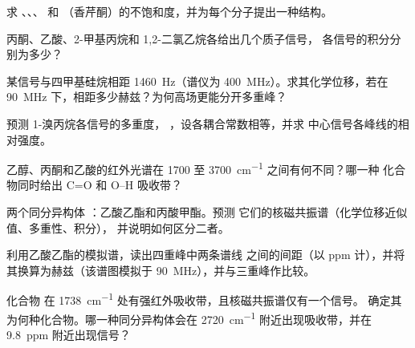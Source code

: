 \begin{exercise}[$\star$]\label{exo:b1:structure-spectroscopy:2}
求 、、、
 和 （香芹酮）的不饱和度，并为每个分子提出一种结构。
\end{exercise}

\begin{exercise}[$\star$]\label{exo:b1:structure-spectroscopy:3}
丙酮、乙酸、2-甲基丙烷和 1,2-二氯乙烷各给出几个质子信号，
各信号的积分分别为多少？
\end{exercise}

\begin{exercise}[$\star$]\label{exo:b1:structure-spectroscopy:4}
某信号与四甲基硅烷相距 \qty{1460}{Hz}（谱仪为
\qty{400}{MHz}）。求其化学位移，若在 \qty{90}{MHz}
下，相距多少赫兹？为何高场更能分开多重峰？
\end{exercise}

\begin{exercise}[$\star\star$]\label{exo:b1:structure-spectroscopy:5}
预测 1-溴丙烷各信号的多重度，
，设各耦合常数相等，并求
中心信号各峰线的相对强度。
\end{exercise}

\begin{exercise}[$\star\star$]\label{exo:b1:structure-spectroscopy:6}
乙醇、丙酮和乙酸的红外光谱在
1700 至 \qty{3700}{cm^{-1}} 之间有何不同？哪一种
化合物同时给出 C=O 和 O--H 吸收带？
\end{exercise}

\begin{exercise}[$\star\star$]\label{exo:b1:structure-spectroscopy:7}
两个同分异构体 ：乙酸乙酯和丙酸甲酯。预测
它们的核磁共振谱（化学位移近似值、多重性、积分），
并说明如何区分二者。
\end{exercise}

\begin{exercise}[$\star\star$]\label{exo:b1:structure-spectroscopy:8}
利用乙酸乙酯的模拟谱，读出四重峰中两条谱线
之间的间距（以 ppm 计），并将其换算为赫兹（该谱图模拟于
\qty{90}{MHz}），并与三重峰作比较。
\end{exercise}

\begin{exercise}[$\star\star$]\label{exo:b1:structure-spectroscopy:9}
化合物  在 \qty{1738}{cm^{-1}} 处有强红外吸收带，且核磁共振谱仅有一个信号。
确定其为何种化合物。哪一种同分异构体会在
\qty{2720}{cm^{-1}} 附近出现吸收带，并在 \qty{9.8}{ppm} 附近出现信号？
\end{exercise}

